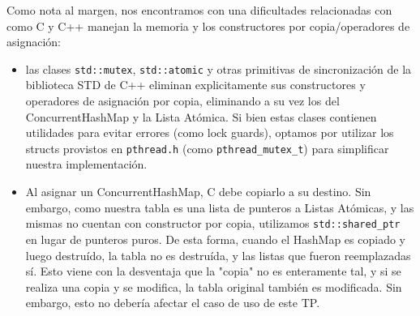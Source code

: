 Como nota al margen, nos encontramos con una dificultades relacionadas con como C y C++ manejan la memoria y los constructores por copia/operadores de asignación:


\begin{itemize}

	\item las clases \texttt{std::mutex}, \texttt{std::atomic} y otras primitivas de sincronización de la biblioteca STD de C++ eliminan explicitamente sus constructores y operadores de asignación por copia, eliminando a su vez los del ConcurrentHashMap y la Lista Atómica. Si bien estas clases contienen utilidades para evitar errores (como lock guards), optamos por utilizar los structs provistos en \texttt{pthread.h} (como \texttt{pthread\_mutex\_t}) para simplificar nuestra implementación.

	\item Al asignar un ConcurrentHashMap, C debe copiarlo a su destino. Sin embargo, como nuestra tabla es una lista de punteros a Listas Atómicas, y las mismas no cuentan con constructor por copia, utilizamos \texttt{std::shared\_ptr} en lugar de punteros puros. De esta forma, cuando el HashMap es copiado y luego destruído, la tabla no es destruída, y las listas que fueron reemplazadas sí. Esto viene con la desventaja que la "copia" no es enteramente tal, y si se realiza una copia y se modifica, la tabla original también es modificada. Sin embargo, esto no debería afectar el caso de uso de este TP.

\end{itemize}